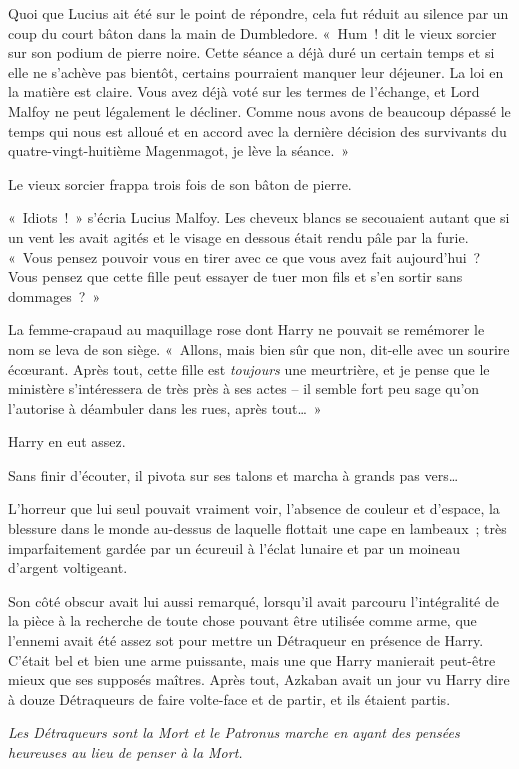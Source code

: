 Quoi que Lucius ait été sur le point de répondre, cela fut réduit au silence par un coup du court bâton dans la main de Dumbledore. «~Hum~! dit le vieux sorcier sur son podium de pierre noire. Cette séance a déjà duré un certain temps et si elle ne s'achève pas bientôt, certains pourraient manquer leur déjeuner. La loi en la matière est claire. Vous avez déjà voté sur les termes de l'échange, et Lord Malfoy ne peut légalement le décliner. Comme nous avons de beaucoup dépassé le temps qui nous est alloué et en accord avec la dernière décision des survivants du quatre-vingt-huitième Magenmagot, je lève la séance.~»

Le vieux sorcier frappa trois fois de son bâton de pierre.

«~Idiots~!~» s'écria Lucius Malfoy. Les cheveux blancs se secouaient autant que si un vent les avait agités et le visage en dessous était rendu pâle par la furie. «~Vous pensez pouvoir vous en tirer avec ce que vous avez fait aujourd'hui~? Vous pensez que cette fille peut essayer de tuer mon fils et s'en sortir sans dommages~?~»

La femme-crapaud au maquillage rose dont Harry ne pouvait se remémorer le nom se leva de son siège. «~Allons, mais bien sûr que non, dit-elle avec un sourire écœurant. Après tout, cette fille est \emph{toujours} une meurtrière, et je pense que le ministère s'intéressera de très près à ses actes -- il semble fort peu sage qu'on l'autorise à déambuler dans les rues, après tout…~»

Harry en eut assez.

Sans finir d'écouter, il pivota sur ses talons et marcha à grands pas vers…

L'horreur que lui seul pouvait vraiment voir, l'absence de couleur et d'espace, la blessure dans le monde au-dessus de laquelle flottait une cape en lambeaux~; très imparfaitement gardée par un écureuil à l'éclat lunaire et par un moineau d'argent voltigeant.

Son côté obscur avait lui aussi remarqué, lorsqu'il avait parcouru l'intégralité de la pièce à la recherche de toute chose pouvant être utilisée comme arme, que l'ennemi avait été assez sot pour mettre un Détraqueur en présence de Harry. C'était bel et bien une arme puissante, mais une que Harry manierait peut-être mieux que ses supposés maîtres. Après tout, Azkaban avait un jour vu Harry dire à douze Détraqueurs de faire volte-face et de partir, et ils étaient partis.

\emph{Les Détraqueurs sont la Mort et le Patronus marche en ayant des pensées heureuses au lieu de penser à la Mort.}

